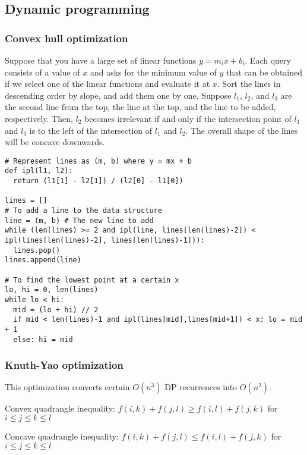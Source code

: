 \documentclass[letterpaper]{article}
\begin{document}
\clearpage

\subsection{Dynamic programming}

\subsubsection{Convex hull optimization}

Suppose that you have a large set of linear functions $y = m_i x + b_i$. Each query consists of a value of $x$ and asks for the minimum value of $y$ that can be obtained if we select one of the linear functions and evaluate it at $x$. Sort the lines in descending order by slope, and add them one by one. Suppose $l_1$, $l_2$, and $l_3$ are the second line from the top, the line at the top, and the line to be added, respectively. Then, $l_2$ becomes irrelevant if and only if the intersection point of $l_1$ and $l_3$ is to the left of the intersection of $l_1$ and $l_2$. The overall shape of the lines will be concave downwards.

\begin{lstlisting}
# Represent lines as (m, b) where y = mx + b
def ipl(l1, l2):
  return (l1[1] - l2[1]) / (l2[0] - l1[0])

lines = []
# To add a line to the data structure
line = (m, b) # The new line to add
while (len(lines) >= 2 and ipl(line, lines[len(lines)-2]) < ipl(lines[len(lines)-2], lines[len(lines)-1])):
  lines.pop()
lines.append(line)

# To find the lowest point at a certain x
lo, hi = 0, len(lines)
while lo < hi:
  mid = (lo + hi) // 2
  if mid < len(lines)-1 and ipl(lines[mid],lines[mid+1]) < x: lo = mid + 1
  else: hi = mid
\end{lstlisting}

\subsubsection{Knuth-Yao optimization}

This optimization converts certain $O(n^3)$ DP recurrences into $O(n^2)$.

Convex quadrangle inequality: $f(i,k) + f(j,l) \geq f(i,l) + f(j,k)$ for $i \leq j \leq k \leq l$

Concave quadrangle inequality: $f(i,k) + f(j,l) \leq f(i,l) + f(j,k)$ for $i \leq j \leq k \leq l$
\end{document}
